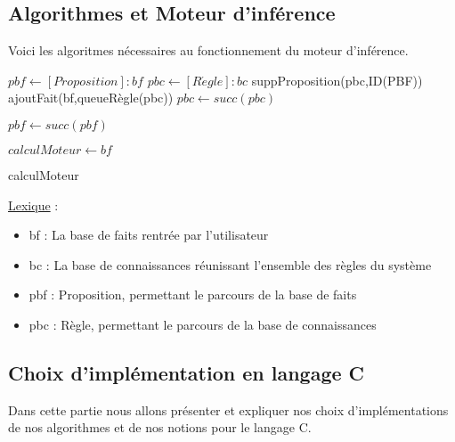\documentclass{article}
\begin{document}
\subsection{Algorithmes et Moteur d'inférence}
Voici les algoritmes nécessaires au fonctionnement du moteur d'inférence.
\begin{algorithm}
    \SetAlgoLined 
    \begin{algorithmic}
       
       
            \STATE $pbf \gets [Proposition] : bf$
                \STATE $pbc \gets [R\acute{e}gle] : bc$
                            \STATE suppProposition(pbc,ID(PBF))
                                \STATE ajoutFait(bf,queueRègle(pbc))
                            \ENDIF
                        \ENDIF
                    \ENDIF
                    \STATE $pbc \gets succ(pbc)$
                \ENDWHILE
                
                \STATE $pbf \gets succ(pbf)$
            \ENDWHILE
             
       \ENDIF
       \STATE  $calculMoteur \gets bf$
    \end{algorithmic}
    \caption{calculMoteur}
\end{algorithm}

\underline{Lexique} :
\begin{itemize}
    \item bf : La base de faits rentrée par l'utilisateur
    \item bc : La base de connaissances réunissant l'ensemble des règles du système
    \item pbf : Proposition, permettant le parcours de la base de faits
    \item pbc : Règle, permettant le parcours de la base de connaissances
\end{itemize}

\subsection{Choix d'implémentation en langage C}
Dans cette partie nous allons présenter et expliquer nos choix d'implémentations de nos algorithmes et de nos notions pour le langage C.\\
\end{document}

